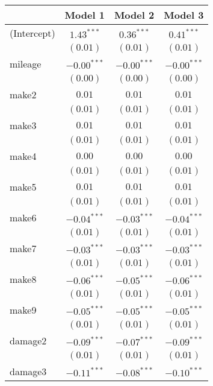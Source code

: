 
\begin{table}
\begin{center}
\begin{tabular}{l c c c}
\hline
 & Model 1 & Model 2 & Model 3 \\
\hline
(Intercept) & $1.43^{***}$  & $0.36^{***}$  & $0.41^{***}$  \\
            & $(0.01)$      & $(0.01)$      & $(0.01)$      \\
mileage     & $-0.00^{***}$ & $-0.00^{***}$ & $-0.00^{***}$ \\
            & $(0.00)$      & $(0.00)$      & $(0.00)$      \\
make2       & $0.01$        & $0.01$        & $0.01$        \\
            & $(0.01)$      & $(0.01)$      & $(0.01)$      \\
make3       & $0.01$        & $0.01$        & $0.01$        \\
            & $(0.01)$      & $(0.01)$      & $(0.01)$      \\
make4       & $0.00$        & $0.00$        & $0.00$        \\
            & $(0.01)$      & $(0.01)$      & $(0.01)$      \\
make5       & $0.01$        & $0.01$        & $0.01$        \\
            & $(0.01)$      & $(0.01)$      & $(0.01)$      \\
make6       & $-0.04^{***}$ & $-0.03^{***}$ & $-0.04^{***}$ \\
            & $(0.01)$      & $(0.01)$      & $(0.01)$      \\
make7       & $-0.03^{***}$ & $-0.03^{***}$ & $-0.03^{***}$ \\
            & $(0.01)$      & $(0.01)$      & $(0.01)$      \\
make8       & $-0.06^{***}$ & $-0.05^{***}$ & $-0.06^{***}$ \\
            & $(0.01)$      & $(0.01)$      & $(0.01)$      \\
make9       & $-0.05^{***}$ & $-0.05^{***}$ & $-0.05^{***}$ \\
            & $(0.01)$      & $(0.01)$      & $(0.01)$      \\
damage2     & $-0.09^{***}$ & $-0.07^{***}$ & $-0.09^{***}$ \\
            & $(0.01)$      & $(0.01)$      & $(0.01)$      \\
damage3     & $-0.11^{***}$ & $-0.08^{***}$ & $-0.10^{***}$ \\

\end{tabular}
\end{center}
\end{table}
